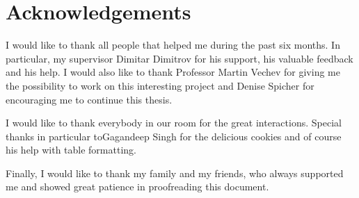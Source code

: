 \chapter{Acknowledgements}

I would like to thank all people that helped me during the past six months. In particular, my supervisor Dimitar Dimitrov for his support, his valuable feedback and his help. I would also like to thank Professor Martin Vechev for giving me the possibility to work on this interesting project and Denise Spicher for encouraging me to continue this thesis.

I would like to thank everybody in our room for the great interactions. Special thanks in particular toGagandeep Singh for the delicious cookies and of course his help with table formatting.

Finally, I would like to thank my family and my friends, who always supported me and showed great patience in proofreading this document.